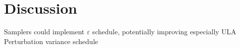 
\section{Discussion}

Samplers could implement $\varepsilon$ schedule, potentially improving especially ULA
Perturbation variance schedule
